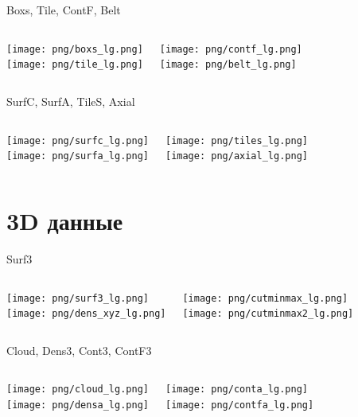 \documentclass[color=usenames]{beamer}
\begin{document}
\begin{frame}{Boxs, Tile, ContF, Belt}
\begin{columns}
\texttt{[image: png/boxs\_lg.png]}\\
\texttt{[image: png/tile\_lg.png]}

\texttt{[image: png/contf\_lg.png]}\\
\texttt{[image: png/belt\_lg.png]}

\end{columns}
\end{frame}

\begin{frame}{SurfC, SurfA, TileS, Axial}
\begin{columns}
\texttt{[image: png/surfc\_lg.png]}\\
\texttt{[image: png/surfa\_lg.png]}

\texttt{[image: png/tiles\_lg.png]}\\
\texttt{[image: png/axial\_lg.png]}

\end{columns}
\end{frame}


\section{3D данные}

\begin{frame}{Surf3}
\begin{columns}
\texttt{[image: png/surf3\_lg.png]}\\
\texttt{[image: png/dens\_xyz\_lg.png]}

\texttt{[image: png/cutminmax\_lg.png]}\\
\texttt{[image: png/cutminmax2\_lg.png]}

\end{columns}
\end{frame}

\begin{frame}{Cloud, Dens3, Cont3, ContF3}
\begin{columns}
\texttt{[image: png/cloud\_lg.png]}\\
\texttt{[image: png/densa\_lg.png]}

\texttt{[image: png/conta\_lg.png]}\\
\texttt{[image: png/contfa\_lg.png]}

\end{columns}
\end{frame}
\end{document}
